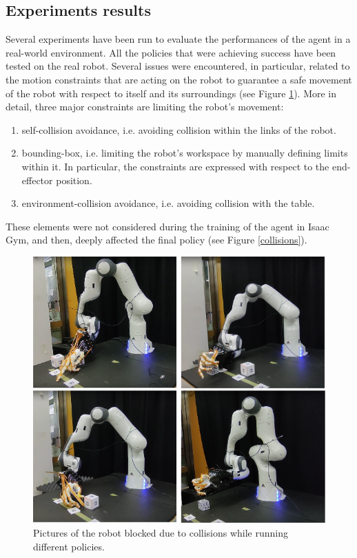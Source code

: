 \documentclass[a4paper]{article}
\begin{document}
\subsection{Experiments results}
Several experiments have been run to evaluate the performances of the agent in a real-world environment. All the policies that were achieving success have been tested on the real robot. Several issues were encountered, in particular, related to the motion constraints that are acting on the robot to guarantee a safe movement of the robot with respect to itself and its surroundings (see Figure \ref{exps}). More in detail, three major constraints are limiting the robot's movement:
\begin{enumerate}
    \item self-collision avoidance, i.e. avoiding collision within the links of the robot.
    \item bounding-box, i.e. limiting the robot's workspace by manually defining limits within it. In particular, the constraints are expressed with respect to the end-effector position. 
    \item environment-collision avoidance, i.e. avoiding collision with the table.
\end{enumerate}
These elements were not considered during the training of the agent in Isaac Gym, and then, deeply affected the final policy (see Figure \ref{collisions}). 

\newpage

\begin{figure}[!hb]
    \centering
    \includegraphics[scale=0.9]{images/experiments.png}
    \caption{Pictures of the robot blocked due to collisions while running different policies.}
    \label{exps}
\end{figure}
\end{document}
